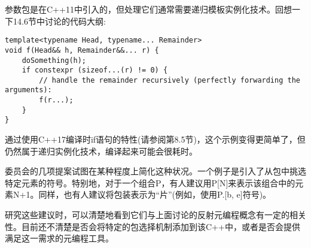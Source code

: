 参数包是在C++11中引入的，但处理它们通常需要递归模板实例化技术。回想一下14.6节中讨论的代码大纲:

\begin{lstlisting}[style=styleCXX]
template<typename Head, typename... Remainder>
void f(Head&& h, Remainder&&... r) {
	doSomething(h);
	if constexpr (sizeof...(r) != 0) {
		// handle the remainder recursively (perfectly forwarding the arguments):
		f(r...);
	}
}
\end{lstlisting}

通过使用C++17编译时if语句的特性(请参阅第8.5节)，这个示例变得更简单了，但仍然属于递归实例化技术，编译起来可能会很耗时。

委员会的几项提案试图在某种程度上简化这种状况。一个例子是引入了从包中挑选特定元素的符号。特别地，对于一个组合P，有人建议用P[N]来表示该组合中的元素N+1。同样，也有人建议将包装表示为“片”(例如，使用P.[b, e]符号)。

研究这些建议时，可以清楚地看到它们与上面讨论的反射元编程概念有一定的相关性。目前还不清楚是否会将特定的包选择机制添加到该C++中，或者是否会提供满足这一需求的元编程工具。




















































